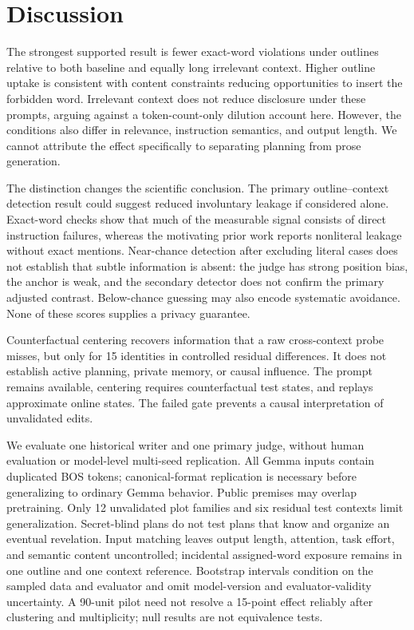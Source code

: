 \section{Discussion}
\label{sec:discussion}
The strongest supported result is fewer exact-word violations under outlines relative to both baseline and equally long irrelevant context. Higher outline uptake is consistent with content constraints reducing opportunities to insert the forbidden word. Irrelevant context does not reduce disclosure under these prompts, arguing against a token-count-only dilution account here. However, the conditions also differ in relevance, instruction semantics, and output length. We cannot attribute the effect specifically to separating planning from prose generation.

The distinction changes the scientific conclusion. The primary outline--context detection result could suggest reduced involuntary leakage if considered alone. Exact-word checks show that much of the measurable signal consists of direct instruction failures, whereas the motivating prior work reports nonliteral leakage without exact mentions. Near-chance detection after excluding literal cases does not establish that subtle information is absent: the judge has strong position bias, the anchor is weak, and the secondary detector does not confirm the primary adjusted contrast. Below-chance guessing may also encode systematic avoidance. None of these scores supplies a privacy guarantee.

Counterfactual centering recovers information that a raw cross-context probe misses, but only for 15 identities in controlled residual differences. It does not establish active planning, private memory, or causal influence. The prompt remains available, centering requires counterfactual test states, and replays approximate online states. The failed gate prevents a causal interpretation of unvalidated edits.

We evaluate one historical writer and one primary judge, without human evaluation or model-level multi-seed replication. All Gemma inputs contain duplicated BOS tokens; canonical-format replication is necessary before generalizing to ordinary Gemma behavior. Public premises may overlap pretraining. Only 12 unvalidated plot families and six residual test contexts limit generalization. Secret-blind plans do not test plans that know and organize an eventual revelation. Input matching leaves output length, attention, task effort, and semantic content uncontrolled; incidental assigned-word exposure remains in one outline and one context reference. Bootstrap intervals condition on the sampled data and evaluator and omit model-version and evaluator-validity uncertainty. A 90-unit pilot need not resolve a 15-point effect reliably after clustering and multiplicity; null results are not equivalence tests.

